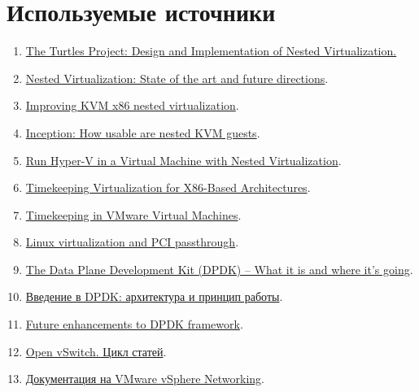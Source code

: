 \documentclass[14pt, a4paper]{article}
\begin{document}
\section*{Используемые источники} 

\begin{enumerate}
    \item \href{https://www.usenix.org/legacy/events/osdi10/tech/full_papers/Ben-Yehuda.pdf}{The Turtles Project: Design and Implementation of Nested Virtualization.}
    \item \href{https://www.linux-kvm.org/images/3/33/02x03-NestedVirtualization.pdf}{Nested Virtualization: State of the art and future directions}.
    \item \href{https://events19.linuxfoundation.org/wp-content/uploads/2017/12/Improving-KVM-x86-Nested-Virtualization-Liran-Alon-Oracle.pdf}{Improving KVM x86 nested virtualization}.
    \item \href{https://www.redhat.com/en/blog/inception-how-usable-are-nested-kvm-guests}{Inception: How usable are nested KVM guests}.
    \item \href{https://docs.microsoft.com/en-us/virtualization/hyper-v-on-windows/user-guide/nested-virtualization}{Run Hyper-V in a Virtual Machine with Nested Virtualization}.
    \item \href{https://www.kernel.org/doc/Documentation/virtual/kvm/timekeeping.txt}{Timekeeping Virtualization for X86-Based Architectures}.
    \item \href{https://www.kernel.org/doc/Documentation/virtual/kvm/timekeeping.txt}{Timekeeping in VMware Virtual Machines}.
    \item \href{https://developer.ibm.com/tutorials/l-pci-passthrough/}{Linux virtualization and PCI passthrough}.
    \item \href{https://it-events.com/system/attachments/files/000/001/102/original/LinuxPiter-DPDK-2015.pdf}{The Data Plane Development Kit (DPDK) – What it is and where it’s going}.
    \item \href{https://blog.selectel.ru/vvedenie-v-dpdk-arxitektura-i-princip-raboty/}{Введение в DPDK: архитектура и принцип работы}.
    \item \href{https://www.slideshare.net/jstleger/dpdk-summit-2015-intel-keith-wiles}{Future enhancements to DPDK framework}.
    \item \href{https://ivirt-it.ru/open-vswitch-cicle/}{Open vSwitch. Цикл статей}.
    \item \href{https://docs.vmware.com/en/VMware-vSphere/6.7/com.vmware.vsphere.networking.doc/GUID-35B40B0B-0C13-43B2-BC85-18C9C91BE2D4.html}{Документация на VMware vSphere Networking}.

\end{enumerate}
\end{document}
